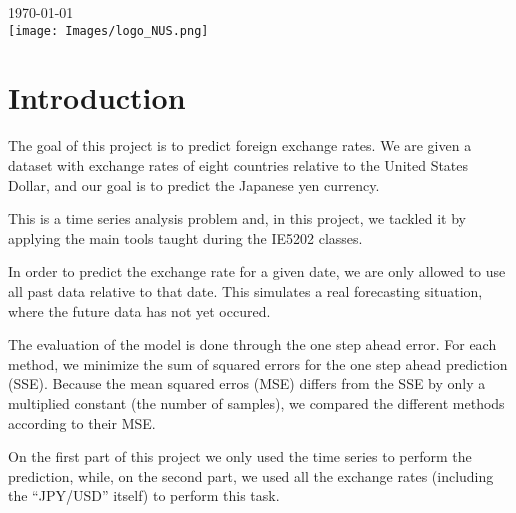 \begin{titlepage}

{\large \today}\\[2cm] %

\texttt{[image: Images/logo\_NUS.png]}\\[1cm] %
	 

\vfill %

\end{titlepage}

\section{Introduction}

The goal of this project is to predict foreign exchange rates. We are given a dataset with
exchange rates of eight countries relative to the United States Dollar, and our goal is to 
predict the Japanese yen currency. 

This is a time series analysis problem and, in this project, we tackled it by applying the main
tools taught during the IE5202 classes.

In order to predict the exchange rate for a given date, 
we are only allowed to use all past data relative to that date. 
This simulates a real forecasting situation, where the future data has not yet occured.

The evaluation of the model is done through the one step ahead error.
For each method, we minimize the sum of squared errors for the one step ahead prediction (SSE).
Because the mean squared erros (MSE) differs from the SSE by only a multiplied constant (the number of samples),
we compared the different methods according to their MSE.

On the first part of this project we only used the time series to perform the prediction,
while, on the second part, we used all the exchange rates (including the ``JPY/USD'' itself)
to perform this task.

